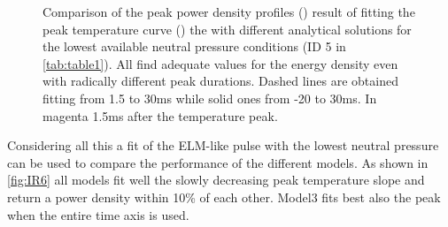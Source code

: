 \begin{figure}
\begin{subfigure}{0.7\linewidth}
         \caption{\phantom{wew}}
         \label{fig:IR6b}
     \end{subfigure}
        \caption{Comparison of the peak power density profiles () result of fitting the peak temperature curve () the with different analytical solutions for the lowest available neutral pressure conditions (ID 5 in \autoref{tab:table1}). All find adequate values for the energy density even with radically different peak durations. Dashed lines are obtained fitting from 1.5 to 30ms while solid ones from -20 to 30ms. In magenta 1.5ms after the temperature peak.}
        \label{fig:IR6}
\end{figure}

Considering all this a fit of the ELM-like pulse with the lowest neutral pressure can be used to compare the performance of the different models. As shown in \autoref{fig:IR6} all models fit well the slowly decreasing peak temperature slope and return a power density within 10\% of each other. Model3 fits best also the peak when the entire time axis is used.

